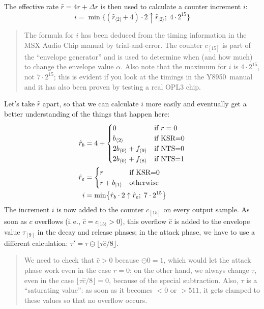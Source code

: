 \documentclass[english]{scrartcl}
\newenvironment{details}{
\par\nobreak\noindent%
\begin{quotation}%
  \footnotesize%
  \noindent\Radioactivity%
}{
\end{quotation}
}
\newcommand{\bit}[2]
	{{#1}_{\langle #2 \rangle}}
\newcommand{\msb}[2]
	{{#1}_{| #2 \rangle}}
\newcommand{\lsb}[2]
	{{#1}_{\langle #2 |}}
\newcommand{\bitlen}[2]
	{{#1}_{[#2]}}
\begin{document}
The effective rate $\hat r = 4r + \Delta r$ is then used to calculate a counter increment $i$:
\[
    i = \min\bigl\{ (\lsb{\hat r}{2} + 4) \cdot 2 \uparrow \msb{\hat r}{2};\; 4\cdot2^{15} \bigr\}
\]
\begin{details}
    The formula for $i$ has been deduced from the timing information in the MSX Audio Chip manual by trial-and-error.
    The counter $\bitlen{c}{15}$ is part of the ``envelope generator'' and is used to determine when (and how much) to change the envelope value $\alpha$.
    Also note that the maximum for $i$ is $4\cdot2^{15}$, not $7\cdot2^{15}$; this is evident if you look at the timings in the Y8950~manual and it has also been proven by testing a real OPL3 chip.
\end{details}

Let's take $\hat r$ apart, so that we can calculate $i$ more easily and eventually get a better understanding of the things that happen here:
\begin{align*}
    \hat r_b &= 4 + \begin{cases}
        0 & \hbox{if $r=0$} \\
        \bit{b}{2} & \hbox{if KSR=0} \\
        2\bit{b}{0} + \bit{f}{9} & \hbox{if NTS=0} \\
        2\bit{b}{0} + \bit{f}{8} & \hbox{if NTS=1}
    \end{cases} \\
    \hat r_e &= \begin{cases}
        r & \hbox{if KSR=0} \\
        r + \msb{b}{1} & \hbox{otherwise}
    \end{cases} \\
    i &= \min\bigl\{ \hat r_b \cdot 2 \uparrow \hat r_e;\; 7\cdot2^{15} \bigr\}
\end{align*}
The increment $i$ is now added to the counter $\bitlen{c}{15}$ on every output sample.
As soon as $c$ overflows (i.\,e., $\hat c = \msb{c}{15} > 0$), this overflow $\hat c$ is added to the envelope value $\bitlen{\tau}{9}$ in the decay and release phases; in the attack phase, we have to use a different calculation: $\tau' = \tau \ominus \lfloor \tau\hat c/8 \rfloor$.


\begin{details}
    We need to check that $\hat c > 0$ because $\ominus 0 = 1$, which would let the attack phase work even in the case $r=0$; on the other hand, we always change $\tau$, even in the case $\lfloor \tau \hat c / 8 \rfloor = 0$, because of the special subtraction.
    Also, $\tau$ is a ``saturating value'': as soon as it becomes $<0$ or $>511$, it gets clamped to these values so that no overflow occurs.
\end{details}
\end{document}
